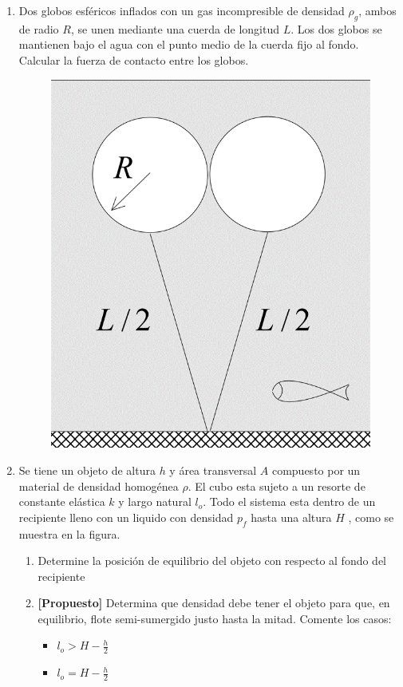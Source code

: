 \documentclass[letterpaper,11pt]{article}
\begin{document}
\begin{enumerate}
\vspace{0.2cm}  

\item
\begin{multicols}{2}
    Dos globos esféricos inflados con un gas incompresible de densidad $\rho_g$, ambos de radio $R$, se unen mediante una cuerda de longitud $L$. Los dos globos se mantienen bajo el agua con el punto medio de la cuerda fijo al fondo. Calcular la fuerza de contacto entre los globos.
    
    \columnbreak
    
    \begin{figure}[H]
        \centering
        \includegraphics[height=0.5\linewidth]{2021-2/img/aux14/globos.png}
    \end{figure}
\end{multicols}

\newpage
\item 
    Se tiene un objeto de altura $h$ y área transversal $A$ compuesto por un material de densidad homogénea $\rho$. El cubo esta sujeto a un resorte de constante elástica $k$ y largo natural $l_o$. Todo el sistema esta dentro de un recipiente lleno con un liquido con densidad $p_f$ hasta una altura $H$ , como se muestra en la figura.
    \begin{enumerate}
        \item Determine la posición de equilibrio del objeto con respecto al fondo del recipiente
        \item \textbf{[Propuesto]} Determina que densidad debe tener el objeto para que, en equilibrio, flote semi-sumergido justo hasta la mitad. Comente los casos:
        \begin{itemize}
            \item $l_o > H -\frac{h}{2}$
            \item $l_o = H -\frac{h}{2}$
        \end{itemize}


\end{enumerate}
\end{enumerate}
\end{document}
